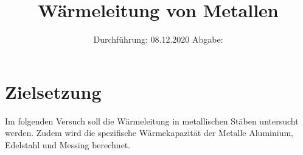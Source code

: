

\subject{V204}
\title{Wärmeleitung von Metallen}
\date{
    Durchführung: 08.12.2020
    \hspace{3em}
    Abgabe: %
}



\maketitle
\thispagestyle{empty}
\tableofcontents
\newpage

\section{Zielsetzung} 

    Im folgenden Versuch soll die Wärmeleitung in metallischen Stäben untersucht werden.
    Zudem wird die spezifische Wärmekapazität der Metalle Aluminium, Edelstahl und Messing berechnet.


\newpage


\newpage


\newpage


\newpage




